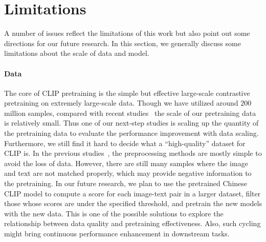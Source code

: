 \documentclass[11pt]{article}
\begin{document}
%
 












































\section*{Limitations}
A number of issues reflect the limitations of this work but also point out some directions for our future research. In this section, we generally discuss some limitations about the scale of data and model. 

\paragraph{Data} 
The core of CLIP pretraining is the simple but effective large-scale contrastive pretraining on extremely large-scale data. Though we have utilized around $200$ million samples, compared with recent studies~\citep{florence, pali} the scale of our pretraining data is relatively small. 
Thus one of our next-step studies is scaling up the quantity of the pretraining data to evaluate the performance improvement with data scaling. 
Furthermore, we still find it hard to decide what a ``high-quality'' dataset for CLIP is. 
In the previous studies~\citep{align, declip}, the preprocessing methods are mostly simple to avoid the loss of data. 
However, there are still many samples where the image and text are not matched properly, which may provide negative information to the pretraining. 
In our future research, we plan to use the pretrained Chinese CLIP model to compute a score for each image-text pair in a larger dataset, filter those whose scores are under the specified threshold, and pretrain the new models with the new data. 
This is one of the possible solutions to explore the relationship between data quality and pretraining effectiveness. 
Also, such cycling might bring continuous performance enhancement in downstream tasks. 
\end{document}
